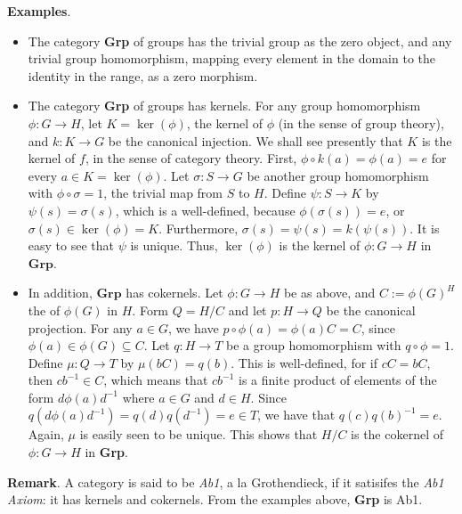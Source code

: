 \documentclass[12pt]{article}
\begin{document}
\textbf{Examples}.  
\begin{itemize}
\item
The category \textbf{Grp} of groups has the trivial group as the zero object, and any trivial group homomorphism, mapping every element in the domain to the identity in the range, as a zero morphism.
\item
The category \textbf{Grp} of groups has kernels.  For any group homomorphism $\phi:G\to H$, let $K=\ker(\phi)$, the kernel of $\phi$ (in the sense of group theory), and $k:K\to G$ be the canonical injection.  We shall see presently that $K$ is the kernel of $f$, in the sense of category theory.  First, $\phi \circ k (a) =\phi(a)=e$ for every $a\in K=\ker(\phi)$.  Let $\sigma:S\to G$ be another group homomorphism with $\phi\circ \sigma = 1$, the trivial map from $S$ to $H$.  Define $\psi:S\to K$ by $\psi(s)=\sigma(s)$, which is a well-defined, because $\phi(\sigma(s))=e$, or $\sigma(s)\in \ker(\phi)=K$.  Furthermore, $\sigma(s) = \psi(s) = k(\psi(s))$.  It is easy to see that $\psi$ is unique.  Thus, $\ker(\phi)$ is the kernel of $\phi:G\to H$ in $\textbf{Grp}$.
\item
In addition, $\textbf{Grp}$ has cokernels.  Let $\phi: G\to H$ be as above, and $C:=\phi(G)^H$ the  of $\phi(G)$ in $H$.  Form $Q=H/C$ and let $p: H\to Q$ be the canonical projection.  For any $a\in G$, we have $p\circ \phi(a) = \phi(a)C = C$, since $\phi(a)\in \phi(G)\subseteq C$.  Let $q: H\to T$ be a group homomorphism with $q\circ \phi = 1$.  Define $\mu: Q\to T$ by $\mu(bC)=q(b)$.  This is well-defined, for if $cC=bC$, then $cb^{-1}\in C$, which means that $cb^{-1}$ is a finite product of elements of the form $d\phi(a)d^{-1}$ where $a\in G$ and $d\in H$.  Since $q(d\phi(a)d^{-1})=q(d)q(d^{-1})=e\in T$, we have that $q(c)q(b)^{-1}=e$.  Again, $\mu$ is easily seen to be unique.  This shows that $H/C$ is the cokernel of $\phi:G\to H$ in \textbf{Grp}.
\end{itemize}

\textbf{Remark}.  A category is said to be \emph{Ab1}, a la Grothendieck, if it satisifes the \emph{Ab1 Axiom}: it has kernels and cokernels.  From the examples above, \textbf{Grp} is Ab1.
\end{document}
